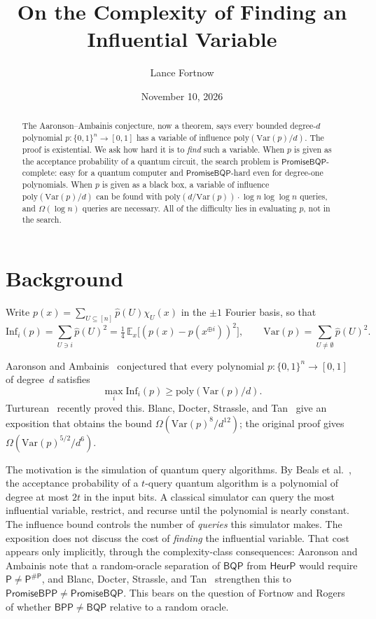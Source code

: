\documentclass[11pt]{article}
\title{On the Complexity of Finding an Influential Variable}
\author{Lance Fortnow}
\date{November 10, 2026}
\theoremstyle{remark}
\newcommand{\Inf}{\mathrm{Inf}}
\newcommand{\Var}{\mathrm{Var}}
\newcommand{\E}{\mathbb{E}}
\newcommand{\poly}{\mathrm{poly}}
\newcommand{\PromiseBQP}{\mathsf{PromiseBQP}}
\newcommand{\PromiseBPP}{\mathsf{PromiseBPP}}
\begin{document}
\maketitle

\begin{abstract}
The Aaronson--Ambainis conjecture, now a theorem, says every bounded degree-$d$ polynomial
$p:\{0,1\}^n\to[0,1]$ has a variable of influence $\poly(\Var(p)/d)$. The proof is
existential. We ask how hard it is to \emph{find} such a variable. When $p$ is given as
the acceptance probability of a quantum circuit, the search problem is
$\PromiseBQP$-complete: easy for a quantum computer and $\PromiseBQP$-hard even for
degree-one polynomials. When $p$ is given as a black box, a variable of influence
$\poly(\Var(p)/d)$ can be found with $\poly(d/\Var(p))\cdot\log n\log\log n$ queries, and
$\Omega(\log n)$ queries are necessary. All of the difficulty lies in evaluating $p$,
not in the search.
\end{abstract}

\section{Background}

Write $p(x)=\sum_{U\subseteq[n]}\hat p(U)\chi_U(x)$ in the $\pm1$ Fourier basis, so that
\[
\Inf_i(p)=\sum_{U\ni i}\hat p(U)^2=\tfrac14\,\E_x\big[(p(x)-p(x^{\oplus i}))^2\big],
\qquad
\Var(p)=\sum_{U\neq\emptyset}\hat p(U)^2 .
\]

Aaronson and Ambainis~\cite{AA14} conjectured that every polynomial
$p:\{0,1\}^n\to[0,1]$ of degree~$d$ satisfies
\[
\max_i\Inf_i(p)\ge\poly(\Var(p)/d).
\]
Turturean~\cite{Tur26} recently proved this. Blanc, Docter, Strassle, and
Tan~\cite{BDST-exp} give an exposition that obtains the bound
$\Omega(\Var(p)^8/d^{12})$; the original proof gives $\Omega(\Var(p)^{5/2}/d^6)$.

The motivation is the simulation of quantum query algorithms. By Beals et
al.~\cite{BBCMW01}, the acceptance probability of a $t$-query quantum algorithm is a
polynomial of degree at most $2t$ in the input bits. A classical simulator can query the
most influential variable, restrict, and recurse until the polynomial is nearly
constant. The influence bound controls the number of \emph{queries} this simulator
makes. The exposition does not discuss the cost of \emph{finding} the influential
variable. That cost appears only implicitly, through the complexity-class consequences:
Aaronson and Ambainis note that a random-oracle separation of $\mathsf{BQP}$ from
$\mathsf{HeurP}$ would require $\mathsf{P}\neq\mathsf{P}^{\#\mathsf{P}}$, and Blanc,
Docter, Strassle, and Tan~\cite{BDST26} strengthen this to
$\PromiseBPP\neq\PromiseBQP$. This bears on the question of Fortnow and
Rogers~\cite{FR99} of whether $\mathsf{BPP}\neq\mathsf{BQP}$ relative to a random oracle.
\end{document}
